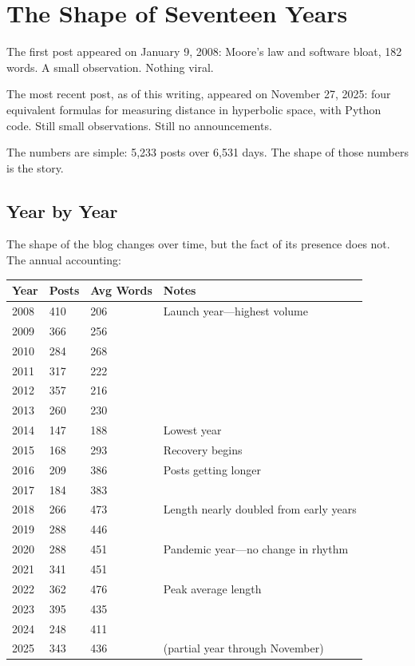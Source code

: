 \chapter{The Shape of Seventeen Years}

\bigskip

The first post appeared on January 9, 2008: Moore's law and software bloat, 182 words. A small observation. Nothing viral.

The most recent post, as of this writing, appeared on November 27, 2025: four equivalent formulas for measuring distance in hyperbolic space, with Python code. Still small observations. Still no announcements.

The numbers are simple: 5,233 posts over 6,531 days. The shape of those numbers is the story.


\bigskip

\section*{Year by Year}

The shape of the blog changes over time, but the fact of its presence does not. The annual accounting:

\begin{center}
\begin{tabular}{llll}
\toprule
\textbf{Year} & \textbf{Posts} & \textbf{Avg Words} & \textbf{Notes} \\
\midrule
2008 & 410 & 206 & Launch year—highest volume \\
2009 & 366 & 256 &  \\
2010 & 284 & 268 &  \\
2011 & 317 & 222 &  \\
2012 & 357 & 216 &  \\
2013 & 260 & 230 &  \\
2014 & 147 & 188 & Lowest year \\
2015 & 168 & 293 & Recovery begins \\
2016 & 209 & 386 & Posts getting longer \\
2017 & 184 & 383 &  \\
2018 & 266 & 473 & Length nearly doubled from early years \\
2019 & 288 & 446 &  \\
2020 & 288 & 451 & Pandemic year—no change in rhythm \\
2021 & 341 & 451 &  \\
2022 & 362 & 476 & Peak average length \\
2023 & 395 & 435 &  \\
2024 & 248 & 411 &  \\
2025 & 343 & 436 & (partial year through November) \\
\bottomrule
\end{tabular}
\end{center}

